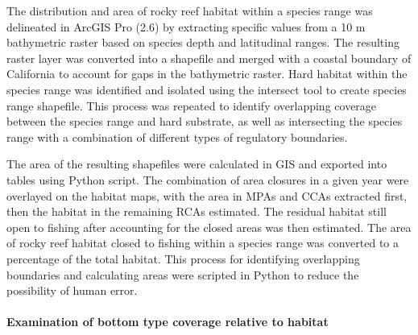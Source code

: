 \documentclass[11pt,
  english,
  a4paper,
]{article}
\begin{document}
\leavevmode\tagmcend\tagstructend\par


The distribution and area of rocky reef habitat within a species range was delineated in ArcGIS Pro (2.6) by extracting specific values from a 10 m bathymetric raster based on species depth and latitudinal ranges. The resulting raster layer was converted into a shapefile and merged with a coastal boundary of California to account for gaps in the bathymetric raster. Hard habitat within the species range was identified and isolated using the intersect tool to create species range shapefile. This process was repeated to identify overlapping coverage between the species range and hard substrate, as well as intersecting the species range with a combination of different types of regulatory boundaries.

\leavevmode\tagmcend\tagstructend\par


The area of the resulting shapefiles were calculated in GIS and exported into tables using Python script. The combination of area closures in a given year were overlayed on the habitat maps, with the area in MPAs and CCAs extracted first, then the habitat in the remaining RCAs estimated. The residual habitat still open to fishing after accounting for the closed areas was then estimated. The area of rocky reef habitat closed to fishing within a species range was converted to a percentage of the total habitat. This process for identifying overlapping boundaries and calculating areas were scripted in Python to reduce the possibility of human error.

\leavevmode\tagmcend\tagstructend\par


\hypertarget{examination-of-bottom-type-coverage-relative-to-habitat}{%
\paragraph{Examination of bottom type coverage relative to habitat}\label{examination-of-bottom-type-coverage-relative-to-habitat}}

\leavevmode\tagmcend\tagstructend

\end{document}
